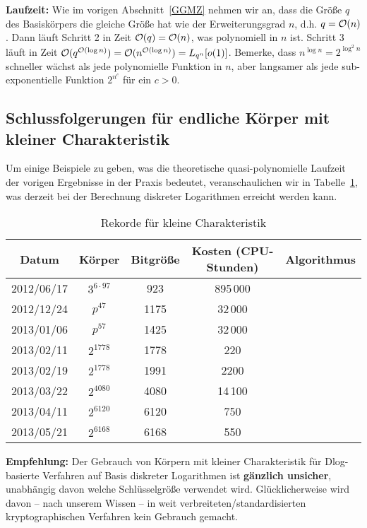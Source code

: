 \begin{refsegment}
\textbf{Laufzeit:}
Wie im vorigen Abschnitt~\ref{GGMZ} nehmen wir an, dass die Größe $q$ des Basiskörpers die gleiche Größe hat wie der Erweiterungsgrad $n$, d.h. $q={\cal O}(n)$. Dann läuft Schritt 2 in Zeit ${\cal O}(q)={\cal O}(n)$, was polynomiell in $n$ ist. Schritt 3 läuft in Zeit ${\cal O}(q^{{\cal O}(\log n)})={\cal O}(n^{{\cal O}(\log n)}) = L_{q^n}[o(1)]$. Bemerke, dass $n^{\log n}=2^{\log^2 n}$ schneller wächst als jede polynomielle Funktion in $n$, aber langsamer als jede sub-exponentielle Funktion $2^{n^{c}}$ für ein $c>0$.


\subsection{Schlussfolgerungen für endliche Körper mit kleiner Charakteristik}

Um einige Beispiele zu geben, was die theoretische quasi-polynomielle Laufzeit der vorigen Ergebnisse in der Praxis bedeutet, veranschaulichen wir in Tabelle~\ref{dlog-table}, was derzeit bei der Berechnung diskreter Logarithmen erreicht werden kann.

\begin{table}[h]
\begin{center}
\begin{tabular}{ccccc}
Datum & Körper & Bitgröße & Kosten (CPU-Stunden) & Algorithmus\\
\hline
 2012/06/17&$3^{6\cdot 97}$ & 923 & 895\,000 & \cite{JL2006}\\
2012/12/24&$p^{47}$ & 1175 & 32\,000 & \cite{Pin2013}\\
2013/01/06&$p^{57}$ & 1425 & 32\,000 & \cite{Pin2013}\\
2013/02/11 &$2^{1778}$ & 1778 & 220 & \cite{Joux2013}\\
2013/02/19 &$2^{1778}$ & 1991 & 2200 & \cite{GGMZ2013}\\
2013/03/22 &$2^{4080}$& 4080 & 14\,100 & \cite{Joux2013}\\
2013/04/11&$2^{6120}$ & 6120 & 750 & \cite{Joux2013}\\
2013/05/21&$2^{6168}$ & 6168 & 550 & \cite{Joux2013}\\
\hline
\end{tabular}
\caption{Rekorde für kleine Charakteristik}
\label{dlog-table}
\end{center}
\end{table}

\textbf{Empfehlung:}
Der Gebrauch von Körpern mit kleiner Charakteristik für Dlog-basierte Verfahren auf Basis diskreter Logarithmen ist \textbf{gänzlich unsicher}, unabhängig davon welche Schlüsselgröße verwendet wird. Glücklicherweise wird davon -- nach unserem Wissen -- in weit verbreiteten/standardisierten kryptographischen Verfahren kein Gebrauch gemacht.




\end{refsegment}
